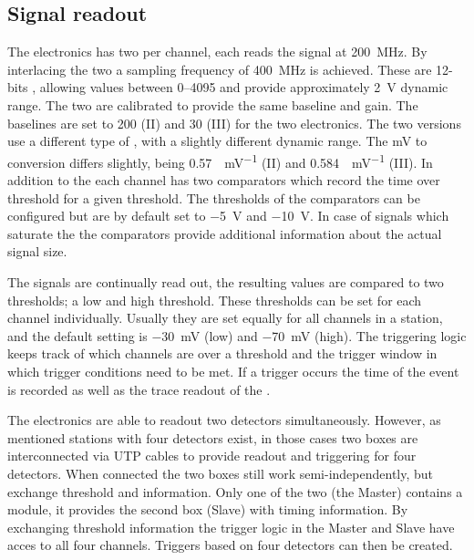 \subsection{Signal readout}

The \hisparc electronics has two \adcs per channel, each reads the \pmt signal at \SI{200}{\mega\hertz}. By interlacing the two \adcs a sampling frequency of \SI{400}{\mega\hertz} is achieved. These are 12-bits \adcs, allowing values between \SIrange{0}{4095}{\adc} and provide approximately \SI{2}{\volt} dynamic range. The two \adcs are calibrated to provide the same baseline and gain. The baselines are set to \SI{200}{\adc} (II) and \SI{30}{\adc} (III) for the two \hisparc electronics. The two versions use a different type of \adc, with a slightly different dynamic range. The \si{\mV} to \si{\adc} conversion differs slightly, being \SI{0.57}{\adc\per\mV} (II) and \SI{0.584}{\adc\per\mV} (III). In addition to the \adcs each channel has two comparators which record the time over threshold for a given threshold. The thresholds of the comparators can be configured but are by default set to \SI{-5}{\volt} and \SI{-10}{\volt}. In case of signals which saturate the \adcs the comparators provide additional information about the actual signal size.

The \pmt signals are continually read out, the resulting \adc values are compared to two thresholds; a low and high threshold. These thresholds can be set for each channel individually. Usually they are set equally for all channels in a station, and the default setting is \SI{-30}{\milli\volt} (low) and \SI{-70}{\milli\volt} (high). The triggering logic keeps track of which channels are over a threshold and the trigger window in which trigger conditions need to be met. If a trigger occurs the time of the event is recorded as well as the trace readout of the \adc.

The \hisparc electronics are able to readout two detectors simultaneously. However, as mentioned stations with four detectors exist, in those cases two boxes are interconnected via UTP cables to provide readout and triggering for four detectors. When connected the two boxes still work semi-independently, but exchange threshold and \gps information. Only one of the two (the Master) contains a \gps module, it provides the second box (Slave) with \gps timing information. By exchanging threshold information the trigger logic in the Master and Slave have acces to all four channels. Triggers based on four detectors can then be created.

